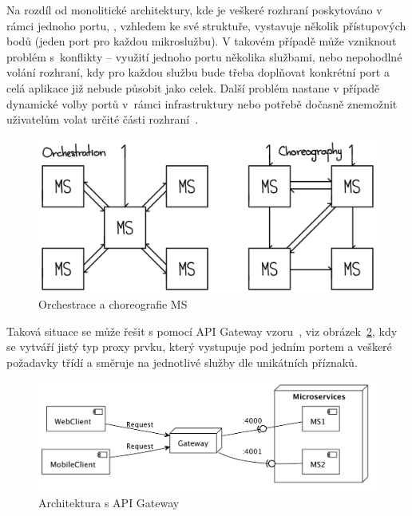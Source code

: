 Na rozdíl od monolitické architektury, kde je veškeré rozhraní poskytováno v rámci jednoho portu, , vzhledem ke své struktuře, vystavuje několik přístupových bodů (jeden port pro každou mikroslužbu).
V takovém případě může vzniknout problém s~konflikty – využití jednoho portu několika službami, nebo nepohodlné volání rozhraní, kdy pro každou službu bude třeba doplňovat konkrétní port a celá aplikace již nebude působit jako celek.
Další problém nastane v případě dynamické volby portů v~rámci infrastruktury nebo potřebě dočasně znemožnit uživatelům volat určité části rozhraní~\cite{gateway}.


\begin{figure}[htbp]
   \centering
   \includegraphics[max width=\textwidth]{assets/msa-communication}
   \caption{Orchestrace a choreografie MS}\label{fig:msa-structure-communication}
\end{figure}


Taková situace se může řešit s pomocí API Gateway vzoru~\cite{gateway}, viz obrázek~\ref{fig:msa-gateway}, kdy se vytváří jistý typ proxy prvku, který vystupuje pod jedním portem a veškeré požadavky třídí a směruje na jednotlivé služby dle unikátních příznaků.


\begin{figure}[htbp]
   \centering
   \includegraphics[max width=\textwidth]{assets/gateway}
   \caption{Architektura s API Gateway}\label{fig:msa-gateway}
\end{figure}



